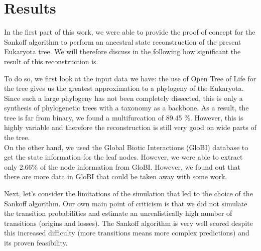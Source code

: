 \chapter{Results}
  In the first part of this work, we were able to provide the proof of concept for the Sankoff 
    algorithm to perform an ancestral state reconstruction of the present Eukaryota tree. We will 
    therefore discuss in the following how significant the result of this reconstruction is.

    To do so, we first look at the input data we have: the use of Open Tree of Life for the tree 
      gives us the greatest approximation to a phylogeny of the Eukaryota. Since such a large 
      phylogeny has not been completely dissected, this is only a synthesis of phylogenetic trees 
      with a taxonomy as a backbone. As a result, the tree is far from binary, we found a 
      multifurcation of 89.45 \%. However, this is highly variable and therefore the reconstruction 
      is still very good on wide parts of the tree. \\
    On the other hand, we used the Global Biotic Interactions (GloBI) database to get the state 
    information for the leaf nodes. However, we were able to extract only 2.66\% of the node 
    information from GloBI. However, we found out that there are more data in GloBI that could be 
    taken away with some work.
    

    Next, let's consider the limitations of the simulation that led to the choice of the Sankoff 
      algorithm. Our own main point of criticism is that we did not simulate the transition 
      probabilities and estimate an unrealistically high number of transitions (origins and losses). 
      The Sankoff algorithm is very well scored despite this increased difficulty (more transitions 
      means more complex predictions) and its proven feasibility.

